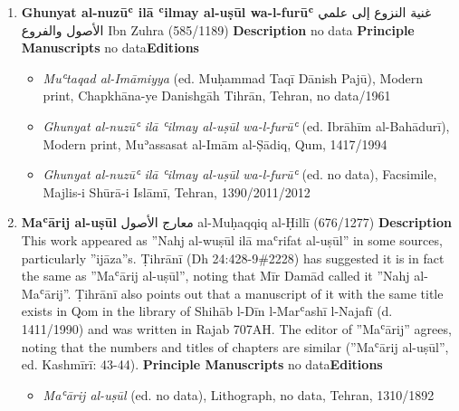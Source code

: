 \documentclass{article}
\begin{document}
\begin{enumerate}
      \item \textbf{Ghunyat al-nuzūʿ ilā ʿilmay al-uṣūl wa-l-furūʿ}
        \newline
        \textarabic{غنية النزوع إلى علمي الأصول والفروع}
        \newline
        Ibn Zuhra
        \newline
        (585/1189)
        \newline
        \newline
        \textbf{Description}
        \newline	
        no data
        \newline
        \newline
    \textbf{Principle Manuscripts}
\newline
no data\newline\textbf{Editions}
\begin{itemize}
        \item \emph{Muʿtaqad al-Imāmiyya} (ed. Muḥammad Taqī Dānish Pajū), Modern print, Chapkhāna-ye Danishgāh Tihrān, Tehran, no data/1961
        
        \item \emph{Ghunyat al-nuzūʿ ilā ʿilmay al-uṣūl wa-l-furūʿ} (ed. Ibrāhīm al-Bahādurī), Modern print, Muʾassasat al-Imām al-Ṣādiq, Qum, 1417/1994
        
        \item \emph{Ghunyat al-nuzūʿ ilā ʿilmay al-uṣūl wa-l-furūʿ} (ed. no data), Facsimile, Majlis-i Shūrā-i Islāmī, Tehran, 1390/2011/2012
        \end{itemize}

      \item \textbf{Maʿārij al-uṣūl}
        \newline
        \textarabic{معارج الأصول}
        \newline
        al-Muḥaqqiq al-Ḥillī
        \newline
        (676/1277)
        \newline
        \newline
        \textbf{Description}
        \newline	
        This work appeared as ''Nahj al-wuṣūl ilā maʿrifat al-uṣūl'' in some sources, particularly ''ijāza''s. Ṭihrānī (Dh 24:428-9\#2228) has suggested it is in fact the same as ''Maʿārij al-uṣūl'', noting that Mīr Damād called it ''Nahj al-Maʿārij''. Ṭihrānī also points out that a manuscript of it with the same title exists in Qom in the library of Shihāb l-Dīn l-Marʿashī l-Najafī (d. 1411/1990) and was written in Rajab 707AH. The editor of ''Maʿārij'' agrees, noting that the numbers and titles of chapters are similar (''Maʿārij al-uṣūl'', ed. Kashmīrī: 43-44).
        \newline
        \newline
    \textbf{Principle Manuscripts}
\newline
no data\newline\textbf{Editions}
\begin{itemize}
        \item \emph{Maʿārij al-uṣūl} (ed. no data), Lithograph, no data, Tehran, 1310/1892
        

\end{itemize}
\end{enumerate}
\end{document}
